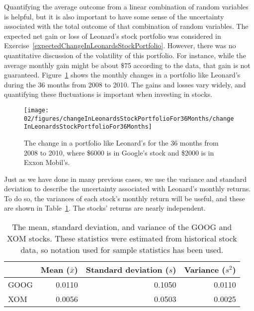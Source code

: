 Quantifying the average outcome from a linear combination of random variables is helpful, but it is also important to have some sense of the uncertainty associated with the total outcome of that combination of random variables. The expected net gain or loss of Leonard's stock portfolio was considered in Exercise~\ref{expectedChangeInLeonardsStockPortfolio}. However, there was no quantitative discussion of the volatility of this portfolio. For instance, while the average monthly gain might be about \$75 according to the data, that gain is not guaranteed. Figure~\ref{changeInLeonardsStockPortfolioFor36Months} shows the monthly changes in a portfolio like Leonard's during the 36 months from 2008 to 2010. The gains and losses vary widely, and quantifying these fluctuations is important when investing in stocks.
\begin{figure}[ht]
\centering
\texttt{[image: 02/figures/changeInLeonardsStockPortfolioFor36Months/changeInLeonardsStockPortfolioFor36Months]}
\caption{The change in a portfolio like Leonard's for the 36 months from 2008 to 2010, where \$6000 is in Google's stock and \$2000 is in Exxon Mobil's.}
\label{changeInLeonardsStockPortfolioFor36Months}
\end{figure}

Just as we have done in many previous cases, we use the variance and standard deviation to describe the uncertainty associated with Leonard's monthly returns. To do so, the variances of each stock's monthly return will be useful, and these are shown in Table~\ref{sumStatOfGOOGXOM}. The stocks' returns are nearly independent.
\begin{table}
\centering
\begin{tabular}{lrrr}
\hline
	& Mean ($\bar{x}$) & Standard deviation ($s$) & Variance ($s^2$) \\
\hline
GOOG & 0.0110	& 0.1050					&	0.0110	\\
XOM & 0.0056		& 0.0503					&	0.0025	\\
\hline
\end{tabular}
\caption{The mean, standard deviation, and variance of the GOOG and XOM stocks. These statistics were estimated from historical stock data, so notation used for sample statistics has been used.}
\label{sumStatOfGOOGXOM}
\end{table}

